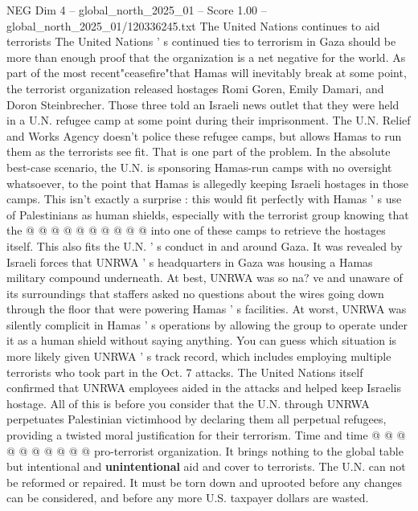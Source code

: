 \begin{textsample}{NEG Dim 4 – global\_north\_2025\_01 – Score 1.00 – global\_north\_2025\_01/120336245.txt}  \label{ex:f4_neg_414}
The United Nations continues to aid terrorists The United Nations ' s continued ties to terrorism in Gaza should be more than enough proof that the organization is a net negative for the world.
As part of the most recent"ceasefire"that Hamas will inevitably break at some point, the terrorist organization released hostages Romi Goren, Emily Damari, and Doron Steinbrecher.
Those three told an Israeli news outlet that they were held in a U.N. refugee camp at some point during their imprisonment.
The U.N.
Relief and Works Agency doesn't police these refugee camps, but allows Hamas to run them as the terrorists see fit.
That is one part of the problem.
In the absolute best-case scenario, the U.N. is sponsoring Hamas-run camps with no oversight whatsoever, to the point that Hamas is allegedly keeping Israeli hostages in those camps.
This isn't exactly a surprise : this would fit perfectly with Hamas ' s use of Palestinians as human shields, especially with the terrorist group knowing that the @ @ @ @ @ @ @ @ @ @ into one of these camps to retrieve the hostages itself.
This also fits the U.N. ' s conduct in and around Gaza.
It was revealed by Israeli forces that UNRWA ' s headquarters in Gaza was housing a Hamas military compound underneath.
At best, UNRWA was so na? ve and unaware of its surroundings that staffers asked no questions about the wires going down through the floor that were powering Hamas ' s facilities.
At worst, UNRWA was silently complicit in Hamas ' s operations by allowing the group to operate under it as a human shield without saying anything.
You can guess which situation is more likely given UNRWA ' s track record, which includes employing multiple terrorists who took part in the Oct. 7 attacks.
The United Nations itself confirmed that UNRWA employees aided in the attacks and helped keep Israelis hostage.
All of this is before you consider that the U.N. through UNRWA perpetuates Palestinian victimhood by declaring them all perpetual refugees, providing a twisted moral justification for their terrorism.
Time and time @ @ @ @ @ @ @ @ @ @ pro-terrorist organization.
It brings nothing to the global table but intentional and \textbf{unintentional} aid and cover to terrorists.
The U.N. can not be reformed or repaired.
It must be torn down and uprooted before any changes can be considered, and before any more U.S. taxpayer dollars are wasted.

\end{textsample}
